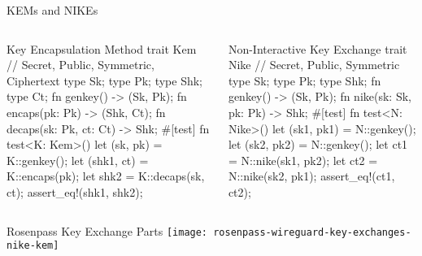 \begin{frame}[fragile,T,s]{KEMs and NIKEs}
\small
  \begin{columns}[t,fullwidth]
      \hfill
    \begin{column}{.47\linewidth}
\begin{rustblock}{Key Encapsulation Method}
trait Kem {
  // Secret, Public, Symmetric, Ciphertext
  type Sk; type Pk; type Shk; type Ct;
  fn genkey() -> (Sk, Pk);
  fn encaps(pk: Pk) -> (Shk, Ct);
  fn decaps(sk: Pk, ct: Ct) -> Shk;
}
#[test]
fn test<K: Kem>() {
  let (sk, pk) = K::genkey();
  let (shk1, ct) = K::encaps(pk);
  let shk2 = K::decaps(sk, ct);
  assert_eq!(shk1, shk2);
}
\end{rustblock}
    \end{column}
    \hfill
    \begin{column}{.47\linewidth}
\begin{rustblock}{Non-Interactive Key Exchange}
trait Nike {
  // Secret, Public, Symmetric
  type Sk; type Pk; type Shk;
  fn genkey() -> (Sk, Pk);
  fn nike(sk: Sk, pk: Pk) -> Shk;
}
#[test]
fn test<N: Nike>() {
  let (sk1, pk1) = N::genkey();
  let (sk2, pk2) = N::genkey();
  let ct1 = N::nike(sk1, pk2);
  let ct2 = N::nike(sk2, pk1);
  assert_eq!(ct1, ct2);
}
\end{rustblock}
    \end{column}
	\hfill
  \end{columns}
  \vfill
\end{frame}

\begin{frame}{Rosenpass Key Exchange Parts}
  \centering
  \texttt{[image: rosenpass-wireguard-key-exchanges-nike-kem]}
\end{frame}








